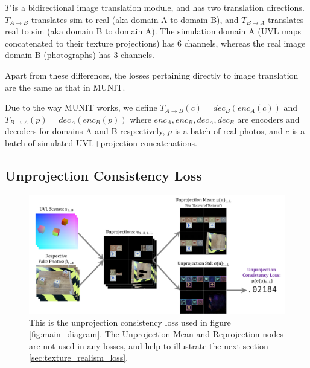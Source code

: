 \documentclass{article}
\begin{document}
$T$ is a bidirectional image translation module, and has two translation directions. $T_{A\rightarrow B}$ translates sim to real (aka domain A to domain B), and $T_{B\rightarrow A}$ translates real to sim (aka domain B to domain A). The simulation domain A (UVL maps concatenated to their texture projections) has 6 channels, whereas the real image domain B (photographs) has 3 channels.

Apart from these differences, the losses pertaining directly to image translation are the same as that in MUNIT. 

Due to the way MUNIT works, we define
$T_{A\rightarrow B}\left(c\right) = dec_B\left(enc_A\left(c\right)\right)$
and 
$T_{B\rightarrow A}\left(p\right) = dec_A\left(enc_B\left(p\right)\right)$
where $enc_A, enc_B, dec_A, dec_B$ are encoders and decoders for domains A and B respectively, $p$ is a batch of real photos, and $c$ is a batch of simulated UVL+projection concatenations.




\subsection{Unprojection Consistency Loss}

\begin{figure}[H]
	\begin{center}
		\includegraphics[width=400pt]{../images/unprojection_consistency_loss.pdf}
	\end{center}
	\caption{
		This is the unprojection consistency loss used in figure \ref{fig:main_diagram}.
		The Unprojection Mean and Reprojection nodes are not used in any losses, and help to illustrate the next section \ref{sec:texture_realism_loss}.
	}
	\label{fig:unprojection_consistency_loss}
\end{figure}
\end{document}
